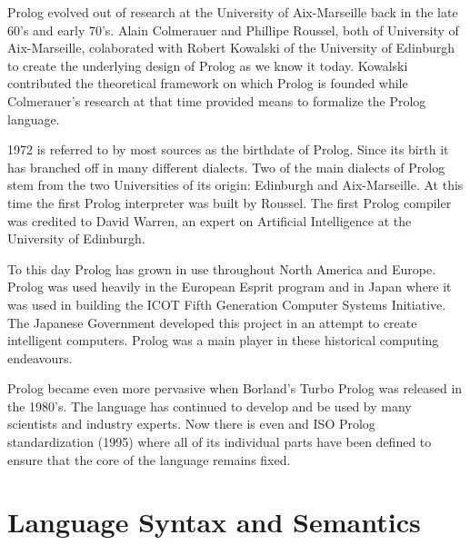 \documentclass[14pt]{article}
\begin{document}
 
Prolog evolved out of research at the University of Aix-Marseille back 
in the late 60's and early 70's. Alain Colmerauer and Phillipe Roussel,
both of University of Aix-Marseille, colaborated with Robert Kowalski of
the University of Edinburgh to create the underlying design of Prolog as
we know it today. Kowalski contributed the theoretical framework on 
which Prolog is founded while Colmerauer's research at that time 
provided means to formalize the Prolog language. 


1972 is referred to by most sources as the birthdate of Prolog. Since 
its birth it has branched off in many different dialects. Two of the 
main dialects of Prolog stem from the two Universities of its origin: 
Edinburgh and Aix-Marseille. At this time the first Prolog interpreter 
was built by Roussel. The first Prolog compiler was credited to 
David Warren, an expert on Artificial Intelligence at the University of
Edinburgh. 

To this day Prolog has grown in use throughout North America and Europe.
Prolog was used heavily in the European Esprit program and in Japan 
where it was used in building the ICOT Fifth Generation Computer 
Systems Initiative. The Japanese Government developed this project 
in an attempt to create intelligent computers. Prolog was a main player 
in these historical computing endeavours. 

Prolog became even more pervasive when Borland's Turbo Prolog was 
released in the 1980's. The language has continued to develop and be 
used by many scientists and industry experts. Now there is even and 
ISO Prolog standardization (1995) where all of its individual parts 
have been defined to ensure that the core of the language remains fixed. 
\newpage 
\section{Language Syntax and Semantics}
\end{document}
